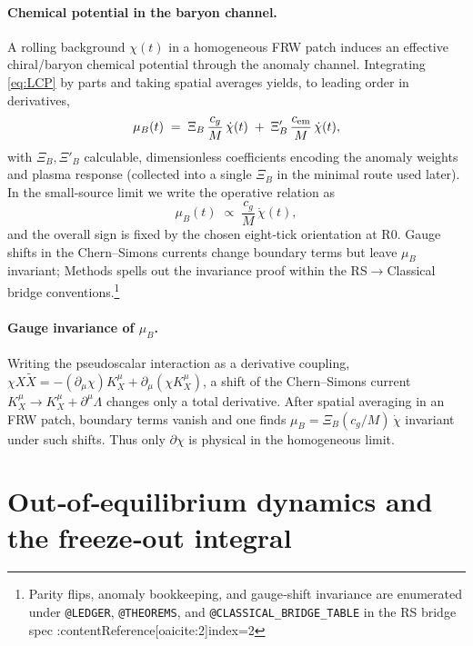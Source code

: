 \documentclass[11pt]{article}
\begin{document}
\paragraph{Chemical potential in the baryon channel.}
A rolling background \(\chi(t)\) in a homogeneous FRW patch induces an effective chiral/baryon chemical potential through the anomaly channel. Integrating \eqref{eq:LCP} by parts and taking spatial averages yields, to leading order in derivatives,
\begin{equation}
  \mu_B(t) \;=\; \Xi_B\,\frac{c_g}{M}\,\dot\chi(t) \;+\; \Xi'_B\,\frac{c_{\rm em}}{M}\,\dot\chi(t),
  \label{eq:muB_general}
\end{equation}
with \(\Xi_B,\Xi'_B\) calculable, dimensionless coefficients encoding the anomaly weights and plasma response (collected into a single \(\Xi_B\) in the minimal route used later). In the small‑source limit we write the operative relation as
\begin{equation}
  \mu_B(t) \;\propto\; \frac{c_g}{M}\,\dot\chi(t),
  \label{eq:muB_min}
\end{equation}
and the overall sign is fixed by the chosen eight‑tick orientation at R0. Gauge shifts in the Chern–Simons currents change boundary terms but leave \(\mu_B\) invariant; Methods spells out the invariance proof within the RS\(\to\)Classical bridge conventions.\footnote{Parity flips, anomaly bookkeeping, and gauge‑shift invariance are enumerated under \texttt{@LEDGER}, \texttt{@THEOREMS}, and \texttt{@CLASSICAL\_BRIDGE\_TABLE} in the RS bridge spec :contentReference[oaicite:2]{index=2}}

\paragraph{Gauge invariance of \(\mu_B\).}
Writing the pseudoscalar interaction as a derivative coupling, \(\chi X\tilde X=-(\partial_\mu\chi)K_X^\mu+\partial_\mu(\chi K_X^\mu)\), a shift of the Chern–Simons current \(K_X^\mu\to K_X^\mu+\partial^\mu\Lambda\) changes only a total derivative. After spatial averaging in an FRW patch, boundary terms vanish and one finds \(\mu_B=\Xi_B (c_g/M)\,\dot\chi\) invariant under such shifts. Thus only \(\partial\chi\) is physical in the homogeneous limit.

\section{Out‑of‑equilibrium dynamics and the freeze‑out integral}
\end{document}
